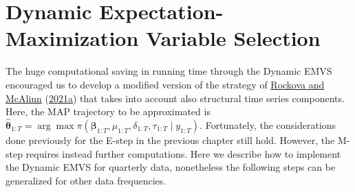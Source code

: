 \documentclass[
  12pt,
]{book}
\theoremstyle{break}
\theoremstyle{nonumberplain}
\begin{document}
\section{Dynamic Expectation-Maximization Variable Selection}

The huge computational saving in running time through the Dynamic EMVS
encouraged us to develop a modified version of the strategy of
\protect\hyperlink{ref-rockova_mcalinn_2021}{Rockova and McAlinn}
(\protect\hyperlink{ref-rockova_mcalinn_2021}{2021a}) that takes into
account also structural time series components. Here, the MAP trajectory
to be approximated is
\(\hat{\boldsymbol{\theta}}_{1:T}=\arg\max \pi(\boldsymbol{\beta}_{1:T},\mu_{1:T},\delta_{1:T},\tau_{1:T}\mid y_{1:T})\).
Fortunately, the considerations done previously for the E-step in the
previous chapter still hold. However, the M-step requires instead
further computations. Here we describe how to implement the Dynamic EMVS
for quarterly data, nonetheless the following steps can be generalized
for other data frequencies.\\
\end{document}
